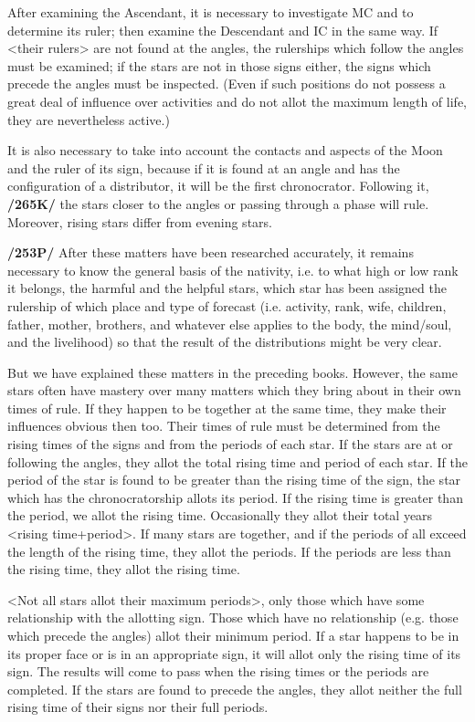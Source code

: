 After examining the Ascendant, it is necessary to investigate MC and to determine its ruler; then examine the Descendant and IC in the same way. If <their rulers> are not found at the angles, the rulerships which follow the angles must be examined; if the stars are not in those signs either, the signs which precede the angles must be inspected. (Even if such positions do not possess a great deal of influence over activities and do not allot the maximum length of life, they are nevertheless active.) 

It is also necessary to take into account the contacts and aspects of the Moon and the ruler of its sign, because if it is found at an angle and has the configuration of a distributor, it will be the first chronocrator.
Following it, \textbf{/265K/} the stars closer to the angles or passing through a phase will rule. Moreover, rising stars differ from evening stars.

\textbf{/253P/} After these matters have been researched accurately, it remains necessary to know the general basis of the nativity, i.e. to what high or low rank it belongs, the harmful and the helpful stars, which star has been assigned the rulership of which place and type of forecast (i.e. activity, rank, wife, children, father, mother, brothers, and whatever else applies to the body, the mind/soul, and the livelihood) so that the result of the distributions might be very clear.

But we have explained these matters in the preceding books. However, the same stars often have mastery over many matters which they bring about in their own times of rule. If they happen to be together at the same time, they make their influences obvious then too. Their times of rule must be determined from the rising times of the signs and from the periods of each star. If the stars are at or following the angles, they allot the total rising time and period of each star. If the period of the star is found to be greater than the rising time of the sign, the star which has the chronocratorship allots its period. If the rising time
is greater than the period, we allot the rising time. Occasionally they allot their total years <rising time+period>. If many stars are together, and if the periods of all exceed the length of the rising time, they allot the periods. If the periods are less than the rising time, they allot the rising time. 

<Not all stars allot their maximum periods>, only those which have some relationship with the allotting sign. Those which have no relationship (e.g. those which precede the angles) allot their minimum period. If a star happens to be in its proper face or is in an appropriate sign, it will allot only the rising time of its sign. The results will come to pass when the rising times or the periods are completed. If the stars are found to precede the angles, they allot neither the full rising time of their signs nor their full periods.

